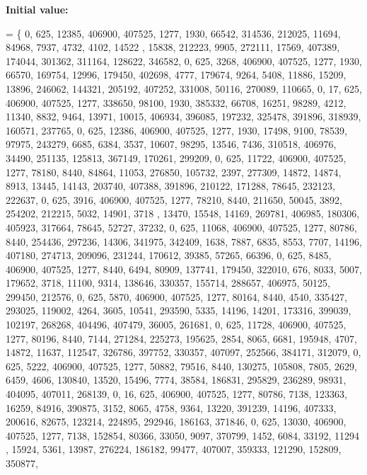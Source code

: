 {\bfseries Initial value\+:}
\begin{DoxyCode}
= \{ 
    0, 625, 12385, 406900, 407525, 1277, 1930, 66542, 314536, 212025, 11694, 84968, 7937, 4732, 4102, 14522
      , 15838, 212223, 9905, 272111, 17569, 407389, 174044, 301362, 311164, 128622, 346582, 
    0, 625, 3268, 406900, 407525, 1277, 1930, 66570, 169754, 12996, 179450, 402698, 4777, 179674, 9264, 
      5408, 11886, 15209, 13896, 246062, 144321, 205192, 407252, 331008, 50116, 270089, 110665, 
    0, 17, 625, 406900, 407525, 1277, 338650, 98100, 1930, 385332, 66708, 16251, 98289, 4212, 11340, 8832, 
      9464, 13971, 10015, 406934, 396085, 197232, 325478, 391896, 318939, 160571, 237765, 
    0, 625, 12386, 406900, 407525, 1277, 1930, 17498, 9100, 78539, 97975, 243279, 6685, 6384, 3537, 10607, 
      98295, 13546, 7436, 310518, 406976, 34490, 251135, 125813, 367149, 170261, 299209, 
    0, 625, 11722, 406900, 407525, 1277, 78180, 8440, 84864, 11053, 276850, 105732, 2397, 277309, 14872, 
      14874, 8913, 13445, 14143, 203740, 407388, 391896, 210122, 171288, 78645, 232123, 222637, 
    0, 625, 3916, 406900, 407525, 1277, 78210, 8440, 211650, 50045, 3892, 254202, 212215, 5032, 14901, 3718
      , 13470, 15548, 14169, 269781, 406985, 180306, 405923, 317664, 78645, 52727, 37232, 
    0, 625, 11068, 406900, 407525, 1277, 80786, 8440, 254436, 297236, 14306, 341975, 342409, 1638, 7887, 
      6835, 8553, 7707, 14196, 407180, 274713, 209096, 231244, 170612, 39385, 57265, 66396, 
    0, 625, 8485, 406900, 407525, 1277, 8440, 6494, 80909, 137741, 179450, 322010, 676, 8033, 5007, 179652,
       3718, 11100, 9314, 138646, 330357, 155714, 288657, 406975, 50125, 299450, 212576, 
    0, 625, 5870, 406900, 407525, 1277, 80164, 8440, 4540, 335427, 293025, 119002, 4264, 3605, 10541, 
      293590, 5335, 14196, 14201, 173316, 399039, 102197, 268268, 404496, 407479, 36005, 261681, 
    0, 625, 11728, 406900, 407525, 1277, 80196, 8440, 7144, 271284, 225273, 195625, 2854, 8065, 6681, 
      195948, 4707, 14872, 11637, 112547, 326786, 397752, 330357, 407097, 252566, 384171, 312079, 
    0, 625, 5222, 406900, 407525, 1277, 50882, 79516, 8440, 130275, 105808, 7805, 2629, 6459, 4606, 130840,
       13520, 15496, 7774, 38584, 186831, 295829, 236289, 98931, 404095, 407011, 268139, 
    0, 16, 625, 406900, 407525, 1277, 80786, 7138, 123363, 16259, 84916, 390875, 3152, 8065, 4758, 9364, 
      13220, 391239, 14196, 407333, 200616, 82675, 123214, 224895, 292946, 186163, 371846, 
    0, 625, 13030, 406900, 407525, 1277, 7138, 152854, 80366, 33050, 9097, 370799, 1452, 6084, 33192, 11294
      , 15924, 5361, 13987, 276224, 186182, 99477, 407007, 359333, 121290, 152809, 350877, 

\end{DoxyCode}
